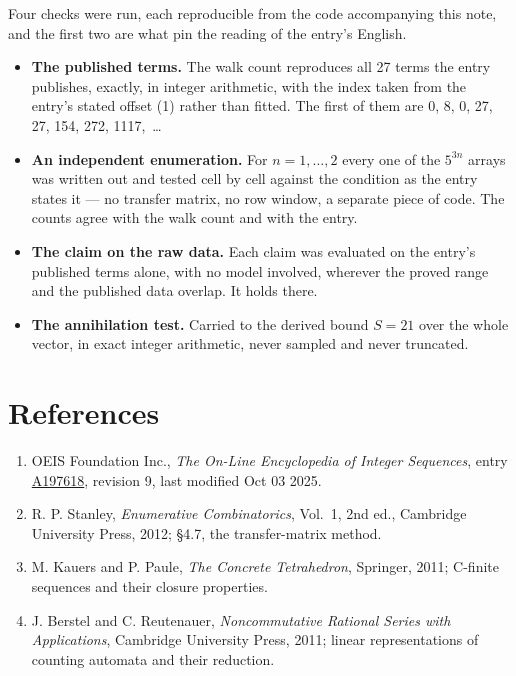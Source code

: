 \documentclass[11pt]{article}
\theoremstyle{definition}
\begin{document}
Four checks were run, each reproducible from the code accompanying this note, and the first two are what pin the reading of the entry's English.

\begin{itemize}

\item {\bfseries The published terms.} The walk count reproduces all 27 terms the entry publishes, exactly, in integer arithmetic, with the index taken from the entry's stated offset (1) rather than fitted. The first of them are 0, 8, 0, 27, 27, 154, 272, 1117,~\dots

\item {\bfseries An independent enumeration.} For $n = 1,\dots,2$ every one of the $5^{3n}$ arrays was written out and tested cell by cell against the condition as the entry states it --- no transfer matrix, no row window, a separate piece of code. The counts agree with the walk count and with the entry.

\item {\bfseries The claim on the raw data.} Each claim was evaluated on the entry's published terms alone, with no model involved, wherever the proved range and the published data overlap. It holds there.

\item {\bfseries The annihilation test.} Carried to the derived bound $S = 21$ over the whole vector, in exact integer arithmetic, never sampled and never truncated.

\end{itemize}

\section{References}

\begin{enumerate}

\item OEIS Foundation Inc., \emph{The On-Line Encyclopedia of Integer Sequences}, entry \href{https://oeis.org/A197618}{A197618}, revision 9, last modified Oct 03 2025.

\item R. P. Stanley, \emph{Enumerative Combinatorics}, Vol.~1, 2nd ed., Cambridge University Press, 2012; \S4.7, the transfer-matrix method.

\item M. Kauers and P. Paule, \emph{The Concrete Tetrahedron}, Springer, 2011; C-finite sequences and their closure properties.

\item J. Berstel and C. Reutenauer, \emph{Noncommutative Rational Series with Applications}, Cambridge University Press, 2011; linear representations of counting automata and their reduction.

\end{enumerate}
\end{document}
